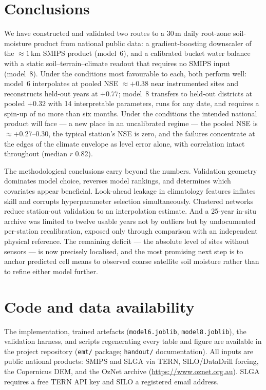 \documentclass[11pt,a4paper]{article}
\begin{document}
\section{Conclusions}\label{sec:conclusions}

We have constructed and validated two routes to a 30\,m daily root-zone
soil-moisture product from national public data: a gradient-boosting
downscaler of the ${\approx}1$\,km SMIPS product (model~6), and a calibrated
bucket water balance with a static soil--terrain--climate readout that
requires no SMIPS input (model~8). Under the conditions most favourable to
each, both perform well: model~6 interpolates at pooled NSE ${\approx}+0.38$
near instrumented sites and reconstructs held-out years at $+0.77$; model~8
transfers to held-out districts at pooled $+0.32$ with 14 interpretable
parameters, runs for any date, and requires a spin-up of no more than six
months. Under the conditions the intended national product will face --- a new
place in an uncalibrated regime --- the pooled NSE is
${\approx}+0.27$--$0.30$, the typical station's NSE is zero, and the failures
concentrate at the edges of the climate envelope as level error alone, with
correlation intact throughout (median $r$ 0.82).

The methodological conclusions carry beyond the numbers. Validation geometry
dominates model choice, reverses model rankings, and determines which
covariates appear beneficial. Look-ahead leakage in climatology features
inflates skill and corrupts hyperparameter selection simultaneously. Clustered
networks reduce station-out validation to an interpolation estimate. And a
25-year in-situ archive was limited to twelve usable years not by outliers but
by undocumented per-station recalibration, exposed only through comparison
with an independent physical reference. The remaining deficit --- the absolute
level of sites without sensors --- is now precisely localised, and the most
promising next step is to anchor predicted cell means to observed coarse
satellite soil moisture rather than to refine either model further.

\section*{Code and data availability}

The implementation, trained artefacts (\texttt{model6.joblib},
\texttt{model8.joblib}), the validation harness, and scripts regenerating
every table and figure are available in the project repository (\texttt{emt/}
package; \texttt{handout/} documentation). All inputs are public national
products: SMIPS and SLGA via TERN, SILO/DataDrill forcing, the Copernicus DEM,
and the OzNet archive (\url{https://www.oznet.org.au}). SLGA requires a free
TERN API key and SILO a registered email address.
\end{document}
